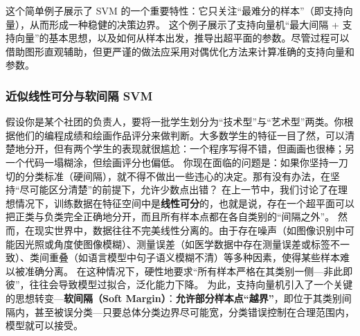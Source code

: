 这个简单例子展示了 SVM 的一个重要特性：它只关注“最难分的样本”（即支持向量），从而形成一种稳健的决策边界。
这个例子展示了支持向量机“最大间隔 + 支持向量”的基本思想，以及如何从样本出发，推导出超平面的参数。尽管过程可以借助图形直观辅助，但更严谨的做法应采用对偶优化方法来计算准确的支持向量和参数。


\subsubsection{近似线性可分与软间隔 SVM}


假设你是某个社团的负责人，要将一批学生划分为“技术型”与“艺术型”两类。你根据他们的编程成绩和绘画作品评分来做判断。大多数学生的特征一目了然，可以清楚地分开，但有两个学生的表现就很尴尬：一个程序写得不错，但画画也很棒；另一个代码一塌糊涂，但绘画评分也偏低。
你现在面临的问题是：如果你坚持一刀切的分类标准（硬间隔），就不得不做出一些违心的决定。那有没有办法，在坚持“尽可能区分清楚”的前提下，允许少数点出错？
在上一节中，我们讨论了在理想情况下，训练数据在特征空间中是\textbf{线性可分}的，也就是说，存在一个超平面可以把正类与负类完全正确地分开，而且所有样本点都在各自类别的“间隔之外”。
然而，在现实世界中，数据往往不完美线性分离的。由于存在噪声（如图像识别中可能因光照或角度使图像模糊）、测量误差（如医学数据中存在测量误差或标签不一致）、类间重叠（如语言模型中句子语义模糊不清）等多种因素，使得某些样本难以被准确分离。
在这种情况下，硬性地要求“所有样本严格在其类别一侧---非此即彼”，往往会导致模型过拟合，泛化能力下降。
为此，支持向量机引入了一个关键的思想转变---\textbf{软间隔（Soft Margin）}：\textbf{允许部分样本点“越界”}，即位于其类别间隔内，甚至被误分类---只要总体分类边界尽可能宽，分类错误控制在合理范围内，模型就可以接受。


